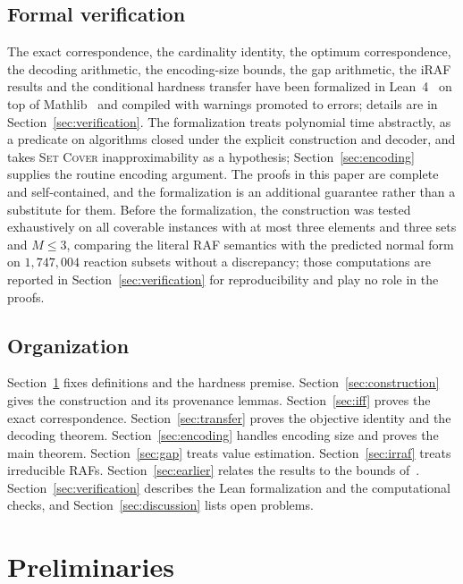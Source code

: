\documentclass[11pt,a4paper]{article}
\theoremstyle{plain}
\theoremstyle{definition}
\theoremstyle{remark}
\newcommand{\SetCover}{\textup{\textsc{Set Cover}}}
\begin{document}
\subsection*{Formal verification}

The exact correspondence, the cardinality identity, the optimum correspondence, the decoding arithmetic, the encoding-size bounds, the gap arithmetic, the iRAF results and the conditional hardness transfer have been formalized in Lean~4~\cite{demoura2021lean4} on top of Mathlib~\cite{mathlib2020} and compiled with warnings promoted to errors; details are in Section~\ref{sec:verification}. The formalization treats polynomial time abstractly, as a predicate on algorithms closed under the explicit construction and decoder, and takes \SetCover{} inapproximability as a hypothesis; Section~\ref{sec:encoding} supplies the routine encoding argument. The proofs in this paper are complete and self-contained, and the formalization is an additional guarantee rather than a substitute for them. Before the formalization, the construction was tested exhaustively on all coverable instances with at most three elements and three sets and $M\le 3$, comparing the literal RAF semantics with the predicted normal form on $1{,}747{,}004$ reaction subsets without a discrepancy; those computations are reported in Section~\ref{sec:verification} for reproducibility and play no role in the proofs.

\subsection*{Organization}

Section~\ref{sec:prelim} fixes definitions and the hardness premise. Section~\ref{sec:construction} gives the construction and its provenance lemmas. Section~\ref{sec:iff} proves the exact correspondence. Section~\ref{sec:transfer} proves the objective identity and the decoding theorem. Section~\ref{sec:encoding} handles encoding size and proves the main theorem. Section~\ref{sec:gap} treats value estimation. Section~\ref{sec:irraf} treats irreducible RAFs. Section~\ref{sec:earlier} relates the results to the bounds of~\cite{steel2013minimal}. Section~\ref{sec:verification} describes the Lean formalization and the computational checks, and Section~\ref{sec:discussion} lists open problems.

\section{Preliminaries}\label{sec:prelim}
\end{document}
